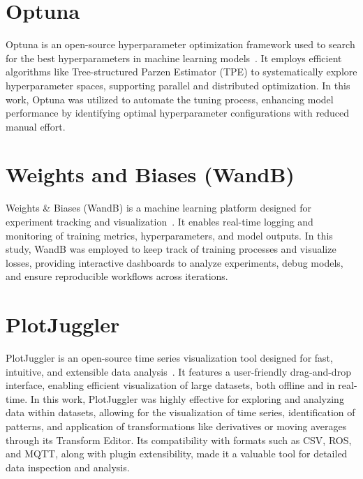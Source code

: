 \section{Optuna}
Optuna is an open-source hyperparameter optimization framework used to search for the best hyperparameters in machine learning models~\cite{akiba_optuna_2019}. It employs efficient algorithms like Tree-structured Parzen Estimator (TPE) to systematically explore hyperparameter spaces, supporting parallel and distributed optimization. In this work, Optuna was utilized to automate the tuning process, enhancing model performance by identifying optimal hyperparameter configurations with reduced manual effort.

\section{Weights and Biases (WandB)}
Weights \& Biases (WandB) is a machine learning platform designed for experiment tracking and visualization~\cite{noauthor_weights_nodate}. It enables real-time logging and monitoring of training metrics, hyperparameters, and model outputs. In this study, WandB was employed to keep track of training processes and visualize losses, providing interactive dashboards to analyze experiments, debug models, and ensure reproducible workflows across iterations.

\section{PlotJuggler}
PlotJuggler is an open-source time series visualization tool designed for fast, intuitive, and extensible data analysis~\cite{faconti_facontidavideplotjuggler_2025}. It features a user-friendly drag-and-drop interface, enabling efficient visualization of large datasets, both offline and in real-time. In this work, PlotJuggler was highly effective for exploring and analyzing data within datasets, allowing for the visualization of time series, identification of patterns, and application of transformations like derivatives or moving averages through its Transform Editor. Its compatibility with formats such as CSV, ROS, and MQTT, along with plugin extensibility, made it a valuable tool for detailed data inspection and analysis.

